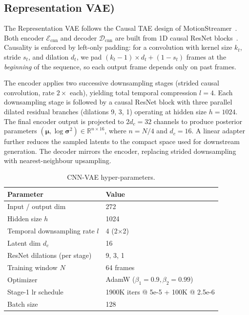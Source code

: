 \documentclass{article}
\begin{document}
\subsection{Representation VAE)}

The Representation VAE follows the Causal TAE design of MotionStreamer~\citep{xiao2025motionstreamer}.
Both encoder $\mathcal{E}_{\text{cnn}}$ and decoder $\mathcal{D}_{\text{cnn}}$ are built from 1D causal ResNet blocks~\citep{he2016deep}.
Causality is enforced by left-only padding: for a convolution with kernel size $k_t$, stride $s_t$, and dilation $d_t$, we pad $(k_t-1)\times d_t + (1-s_t)$ frames at the \emph{beginning} of the sequence, so each output frame depends only on past frames.

The encoder applies two successive downsampling stages (strided causal convolution, rate $2\times$ each), yielding total temporal compression $l=4$.
Each downsampling stage is followed by a causal ResNet block with three parallel dilated residual branches (dilations 9, 3, 1) operating at hidden size $h=1024$.
The final encoder output is projected to $2d_c=32$ channels to produce posterior parameters $(\boldsymbol{\mu}, \log\boldsymbol{\sigma}^2) \in \mathbb{R}^{n \times 16}$, where $n=N/4$ and $d_c=16$.
A linear adapter further reduces the sampled latents to the compact space used for downstream generation.
The decoder mirrors the encoder, replacing strided downsampling with nearest-neighbour upsampling.

\begin{table}[h]
\centering
\caption{CNN-VAE hyper-parameters.}
\label{tab:cnn_vae_arch}
\begin{tabular}{ll}
\toprule
Parameter & Value \\
\midrule
Input / output dim & 272 \\
Hidden size $h$ & 1024 \\
Temporal downsampling rate $l$ & 4 (2$\times$2) \\
Latent dim $d_c$ & 16 \\
ResNet dilations (per stage) & 9, 3, 1 \\
Training window $N$ & 64 frames \\
Optimizer & AdamW ($\beta_1{=}0.9, \beta_2{=}0.99$) \\
Stage-1 lr schedule & 1900K iters @ 5e-5 + 100K @ 2.5e-6 \\
Batch size & 128 \\
\bottomrule
\end{tabular}
\end{table}
\end{document}

